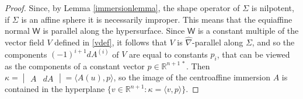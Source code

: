 \documentclass [leqno, 10pt]{amsart}
\theoremstyle{definition}
\numberwithin{equation}{section}
\newcommand{\ka}{\kappa}
\newcommand{\nm}{\mathsf{W}}
\newcommand{\lb}{\langle}
\newcommand{\ra}{\rangle}
\newcommand{\hnabla}{\widehat{\nabla}}
\newcommand{\rea}{\mathbb R}
\begin{document}
\begin{proof}
Since, by Lemma \ref{immersionlemma}, the shape operator of $\Sigma$ is nilpotent, if $\Sigma$ is an affine sphere it is necessarily improper. This means that the equiaffine normal $\nm$ is parallel along the hypersurface. Since $\nm$ is a constant multiple of the vector field $V$ defined in \eqref{vdef}, it follows that $V$ is $\hnabla$-parallel along $\Sigma$, and so the components $(-1)^{i+1}dA^{(i)}$ of $V$ are equal to constants $p_{i}$, that can be viewed as the components of a constant vector $p \in \rea^{n+1\,\ast}$. Then $\ka = \begin{vmatrix} A & dA \end{vmatrix} = \lb A(u), p\ra$, so the image of the centroaffine immersion $A$ is contained in the hyperplane $\{v \in \rea^{n+1}: \ka = \lb v, p\ra\}$. 


\end{proof}
\end{document}

